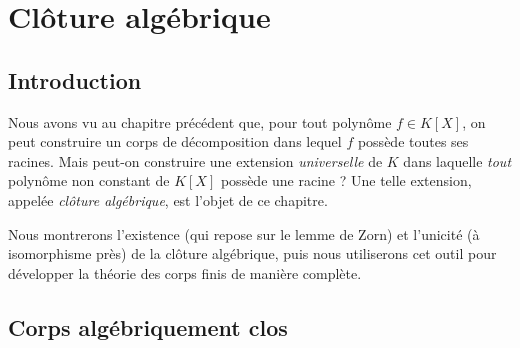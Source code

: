 \documentclass[12pt,a4paper,openany]{book}
\theoremstyle{definition}
\begin{document}
\bigskip
\begin{center}
\end{center}

\chapter{Clôture algébrique}
\label{chap:cloture}

\section*{Introduction}

Nous avons vu au chapitre précédent que, pour tout polynôme $f \in K[X]$, on peut
construire un corps de décomposition dans lequel $f$ possède toutes ses racines.
Mais peut-on construire une extension \emph{universelle} de $K$ dans laquelle
\emph{tout} polynôme non constant de $K[X]$ possède une racine ? Une telle
extension, appelée \emph{clôture algébrique}, est l'objet de ce chapitre.

Nous montrerons l'existence (qui repose sur le lemme de Zorn) et l'unicité (à
isomorphisme près) de la clôture algébrique, puis nous utiliserons cet outil pour
développer la théorie des corps finis de manière complète.

\section{Corps algébriquement clos}
\label{sec:algebriquement-clos}
\end{document}

